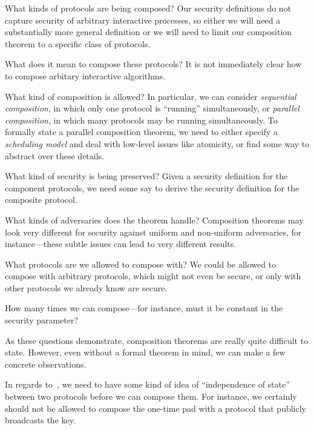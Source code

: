 \begin{questions}
  \item What kinds of protocols are being composed? Our security definitions do not
    capture security of arbitrary interactive processes, so either we will
    need a substantially more general definition or we will need to limit
    our composition theorem to a specific class of
    protocols.\label{q:composed-protocols}
  \item What does it mean to compose these protocols? It is not immediately
    clear how to compose arbitary interactive
    algorithms.\label{q:composition-meaning}
  \item What kind of composition is allowed? In particular, we can
    consider \emph{sequential composition}, in which only one protocol is
    ``running'' simultaneously, or \emph{parallel composition}, in which many
    protocols may be running simultaneously. To formally state a parallel
    composition theorem, we need to either specify a \emph{scheduling model} and
    deal with low-level issues like atomicity, or find some way to abstract over
    these details.\label{q:allowed-composition}
  \item What kind of security is being preserved? Given a security definition
    for the component protocols, we need some say to derive the security
    definition for the composite protocol.\label{q:preserved-security}
  \item What kinds of adversaries does the theorem handle? Composition theorems
    may look very different for security against uniform and non-uniform
    adversaries, for instance---these subtle issues can lead to very different
    results.\label{q:adversarial-model}
  \item What protocols are we allowed to compose with? We could be allowed to
    compose with arbitrary protocols, which might not even be secure, or only
    with other protocols we already know are secure.\label{q:compose-with}
  \item How many times we can compose---for instance, must it be constant in the
    security parameter?\label{q:count-compositions}
\end{questions}

As these questions demonstrate, composition theorems are really quite difficult
to state. However, even without a formal theorem in mind, we can make a few
concrete observations.

In regards to~, we need to have some kind of
idea of ``independence of state'' between two protocols before we can compose
them. For instance, we certainly should not be allowed to compose the one-time
pad with a protocol that publicly broadcasts the key.

